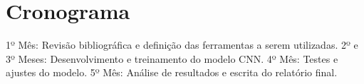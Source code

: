 \section{Cronograma}
1º Mês: Revisão bibliográfica e definição das ferramentas a serem utilizadas.
2º e 3º Meses: Desenvolvimento e treinamento do modelo CNN.
4º Mês: Testes e ajustes do modelo.
5º Mês: Análise de resultados e escrita do relatório final.